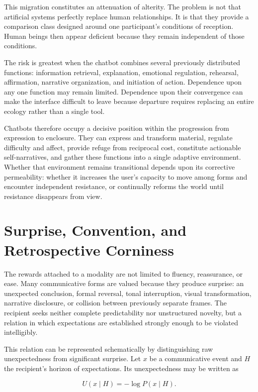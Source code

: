 \documentclass[11pt]{article}
\begin{document}
This migration constitutes an attenuation of alterity. The problem is not
that artificial systems perfectly replace human relationships. It is that
they provide a comparison class designed around one participant's conditions
of reception. Human beings then appear deficient because they remain
independent of those conditions.

The risk is greatest when the chatbot combines several previously distributed
functions: information retrieval, explanation, emotional regulation,
rehearsal, affirmation, narrative organization, and initiation of action.
Dependence upon any one function may remain limited. Dependence upon their
convergence can make the interface difficult to leave because departure
requires replacing an entire ecology rather than a single tool.

Chatbots therefore occupy a decisive position within the progression from
expression to enclosure. They can express and transform material, regulate
difficulty and affect, provide refuge from reciprocal cost, constitute
actionable self-narratives, and gather these functions into a single adaptive
environment. Whether that environment remains transitional depends upon its
corrective permeability: whether it increases the user's capacity to move
among forms and encounter independent resistance, or continually reforms the
world until resistance disappears from view.

\section{Surprise, Convention, and Retrospective Corniness}

The rewards attached to a modality are not limited to fluency, reassurance,
or ease. Many communicative forms are valued because they produce surprise:
an unexpected conclusion, formal reversal, tonal interruption, visual
transformation, narrative disclosure, or collision between previously
separate frames. The recipient seeks neither complete predictability nor
unstructured novelty, but a relation in which expectations are established
strongly enough to be violated intelligibly.

This relation can be represented schematically by distinguishing raw
unexpectedness from significant surprise. Let \(x\) be a communicative event
and \(H\) the recipient's horizon of expectations. Its unexpectedness may be
written as

\begin{equation}
  U(x\mid H)=-\log P(x\mid H).
  \label{eq:unexpectedness}
\end{equation}
\end{document}
